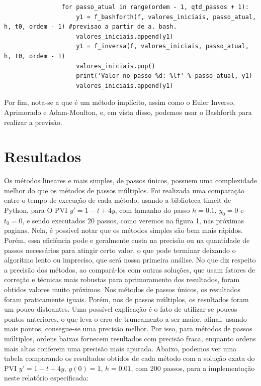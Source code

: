 \documentclass{article}
\begin{document}
\begin{otherlanguage}{brazil}
\begin{lstlisting}
                for passo_atual in range(ordem - 1, qtd_passos + 1):
                    y1 = f_bashforth(f, valores_iniciais, passo_atual, h, t0, ordem - 1) #previsao a partir de a. bash.
                    valores_iniciais.append(y1)
                    y1 = f_inversa(f, valores_iniciais, passo_atual, h, t0, ordem - 1)
                    valores_iniciais.pop()
                    print('Valor no passo %d: %lf' % passo_atual, y1)
                    valores_iniciais.append(y1)
        \end{lstlisting}
        Por fim, nota-se a que é um método implícito, assim como o Euler Inverso, Aprimorado e Adam-Moulton, e, em vista disso, podemos usar o Bashforth para realizar a previsão.  
\newpage
\section{Resultados}
    Os métodos lineares e mais simples, de passos únicos, possuem uma complexidade melhor do que os métodos de passos múltiplos. Foi realizada uma comparação entre o tempo de execução de cada método, usando a biblioteca timeit de Python, para O PVI $y' = 1 - t + 4y$, com tamanho do passo $h = 0.1$, $y_0 = 0$ e $t_0 = 0$, e sendo executados 20 passos, como veremos na figura 1, nas próximas paginas. Nela, é possível notar que os métodos simples são bem mais rápidos. Porém, essa eficiência pode e geralmente custa na precisão ou na quantidade de passos necessários para atingir certo valor, o que pode terminar deixando o algoritmo lento ou impreciso, que será nossa primeira análise.\newline
    No que diz respeito a precisão dos métodos, ao compará-los com outras soluções, que usam fatores de correção e técnicas mais robustas para aprimoramento dos resultados, foram obtidos valores muito próximos. Nos métodos de passos únicos, os resultados foram praticamente iguais. Porém, nos de passos múltiplos, os resultados foram um pouco distoantes. Uma possível explicação é o fato de utilizar-se poucos pontos anteriores, o que leva o erro de truncamento a ser maior, afinal, usando mais pontos, consegue-se uma precisão melhor. Por isso, para métodos de passos múltiplos, ordens baixas fornecem resultados com precisão fraca, enquanto ordens mais altas conferem uma precisão mais apurada.
    Abaixo, podemos ver uma tabela comparando os resultados obtidos de cada método com a solução exata do PVI $y' = 1 - t + 4y$, $y(0) = 1$, $h = 0.01$, com 200 passos, para a implementação neste relatório especificada:
    


\end{otherlanguage}
\end{document}
